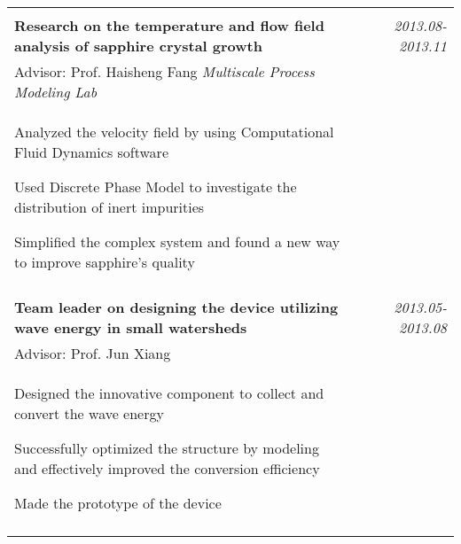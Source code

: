 \documentclass[a4paper,10pt]{article}
\begin{document}
\begin{tabular}{p{13.5cm}p{0.5cm}r}
\multicolumn{3}{c}{} \\
\textbf{Research on the temperature and flow field analysis of sapphire crystal growth}  && \emph{2013.08-2013.11} \\
\hspace{1em} Advisor: Prof. Haisheng Fang \hspace{6.7em} \emph{Multiscale Process Modeling Lab}  && \vspace{-0.5em} \\
\begin{compactitem}
       \item Analyzed the velocity field by using Computational Fluid Dynamics software\vspace{0.2em}
       \item Used Discrete Phase Model to investigate the distribution of inert impurities\vspace{0.2em}
       \item Simplified the complex system and found a new way to improve sapphire's quality %
     \end{compactitem}&&\vspace{-2.2em} \\
\multicolumn{3}{c}{} \\
 \textbf{Team leader on designing the device utilizing wave energy in small watersheds}&&  \emph{2013.05-2013.08} \\
\hspace{1em}  Advisor: Prof. Jun Xiang  & &\vspace{-0.5em}\\
\begin{compactitem}
       \item Designed the innovative component to collect and convert the wave energy\vspace{0.2em}
       \item Successfully optimized the structure by modeling and effectively improved the conversion efficiency\vspace{0.2em}
       \item Made the prototype of the device
     \end{compactitem}&&\vspace{-1em} \\
\multicolumn{3}{c}{} \vspace{-1.5em} \\


\end{tabular}
\end{document}
